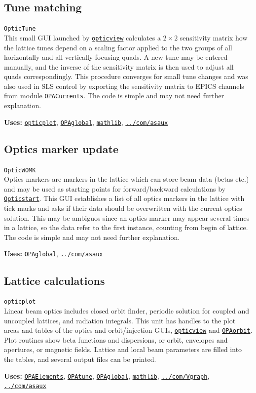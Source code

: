 \documentclass[12pt]{article}
\newcommand\code[1]{{\tt #1}}
\newcommand{\opagui}[1]{\colorbox{blue!20}{\code{#1}}}
\newcommand{\oguih}[2]{\subsection{\label{#2}#1}{\Huge\opagui{#2}}\\}
\newcommand{\ogui}[1]{\hyperref[#1]{\opagui{#1}}}
\newcommand{\opaguif}[1]{\colorbox{violet!30}{\code{#1}}}
\newcommand{\oguif}[1]{\hyperref[#1]{\opaguif{#1}}}
\newcommand{\opauni}[1]{\colorbox{orange!30}{\code{#1}}}
\newcommand{\ounih}[2]{\subsection{\label{#2}#1}{\Huge\opauni{#2}}\\}
\newcommand{\ouni}[1]{\hyperref[#1]{\opauni{#1}}}
\newcommand{\uses}[1]{{\bf Uses: } #1}
\newcommand{\desc}[1]{#1}
\begin{document}
\oguih{Tune matching}{OpticTune} 

This small GUI launched by \ogui{opticview} calculates a $2\times 2$ sensitivity matrix how the lattice tunes depend on a scaling factor applied to the two groups of all horizontally and all vertically focusing quads. A new tune may be entered manually, and the inverse of the sensitivity matrix is then used to adjust all quads correspondingly. This procedure converges for small tune changes and was also used in SLS control by exporting the sensitivity matrix to EPICS channels from module \ogui{OPACurrents}. The code is simple and may not need further explanation.

\uses{\ouni{opticplot}, \ouni{OPAglobal}, \ouni{mathlib}, \ouni{../com/asaux}} 


\oguih{Optics marker update}{OpticWOMK} 
\desc{Optics markers are markers in the lattice which can store beam data (betas etc.) and may be used as starting points for forward/backward calculations by \ogui{Opticstart}. This GUI establishes a list of all optics markers in the lattice with tick marks and asks if their data should be overwritten with the current optics solution. This may be ambiguos since an optics marker may appear several times in a lattice, so the data refer to the first instance, counting from begin of lattice. The code is simple and may not need further explanation.}

\uses{\ouni{OPAglobal}, \ouni{../com/asaux}} 




\ounih{Lattice calculations}{opticplot} 

\desc{Linear beam optics includes closed orbit finder, periodic solution for coupled and uncoupled lattices, and radiation integrals. 
This unit has handles to the plot areas and tables of the optics and orbit/injection GUIs, \ogui{opticview} and \ogui{OPAorbit}.
Plot routines show beta functions and dispersions, or orbit, envelopes and apertures, or magnetic fields. Lattice and local beam parameters are filled into the tables, and several output files can be printed. 
}


\uses{
 \ouni{OPAElements}, \ogui{OPAtune}, \ouni{OPAglobal}, \ouni{mathlib}, \oguif{../com/Vgraph}, \ouni{../com/asaux}}
\end{document}
